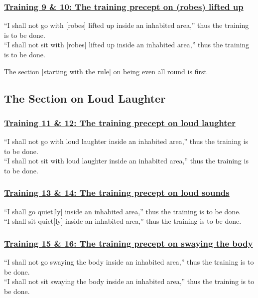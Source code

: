 \subsubsection*{\hyperref[sekh9-10]{Training 9 \& 10: The training precept on (robes) lifted up}}
\label{training9-10}
``I shall not go with [robes] lifted up inside an inhabited area,'' thus the training is to be done.\\
``I shall not sit with [robes] lifted up inside an inhabited area,'' thus the training is to be done.

\begin{center}
  The section [starting with the rule] on being even all round is first
\end{center}

\setsubsecheadstyle{\subsectionFmt}
\subsection{The Section on Loud Laughter}
\vspace{0.2cm}

\subsubsection*{\hyperref[sekh11-12]{Training 11 \& 12: The training precept on loud laughter}}
\label{training11-12}
``I shall not go with loud laughter inside an inhabited area,'' thus the training is to be done.\\
``I shall not sit with loud laughter inside an inhabited area,'' thus the training is to be done.

\subsubsection*{\hyperref[sekh13-14]{Training 13 \& 14: The training precept on loud sounds}}
\label{training13-14}
``I shall go quiet[ly] inside an inhabited area,'' thus the training is to be done.\\
``I shall sit quiet[ly] inside an inhabited area,'' thus the training is to be done.

\subsubsection*{\hyperref[sekh15-16]{Training 15 \& 16: The training precept on swaying the body}}
\label{training15-16}
``I shall not go swaying the body inside an inhabited area,'' thus the training is to be done.\\
``I shall not sit swaying the body inside an inhabited area,'' thus the training is to be done.

